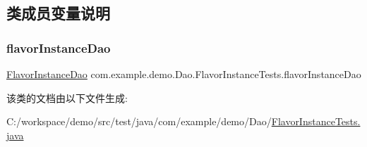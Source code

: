 \subsection{类成员变量说明}
\mbox{\label{classcom_1_1example_1_1demo_1_1_dao_1_1_flavor_instance_tests_a4a00bbbb08fd5e2de00e55fc961f330f}} 
\subsubsection{\texorpdfstring{flavor\+Instance\+Dao}{flavorInstanceDao}}
{\footnotesize\ttfamily \mbox{\hyperlink{interfacecom_1_1example_1_1demo_1_1dao_1_1_flavor_instance_dao}{Flavor\+Instance\+Dao}} com.\+example.\+demo.\+Dao.\+Flavor\+Instance\+Tests.\+flavor\+Instance\+Dao\hspace{0.3cm}{\ttfamily [private]}}



该类的文档由以下文件生成\+:\begin{DoxyCompactItemize}
\item 
C\+:/workspace/demo/src/test/java/com/example/demo/\+Dao/\mbox{\hyperlink{_flavor_instance_tests_8java}{Flavor\+Instance\+Tests.\+java}}\end{DoxyCompactItemize}
